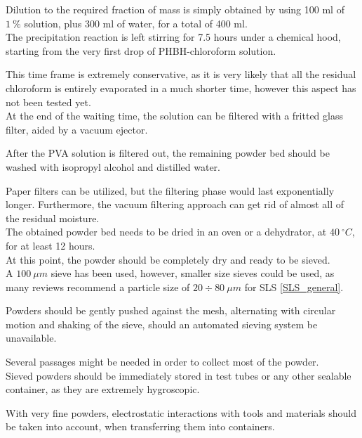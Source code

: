 \documentclass{article}
\begin{document}
        Dilution to the required fraction of mass is simply obtained by using 100 ml of $1 \ \%$ solution, 
        plus 300 ml of water, for a total of 400 ml. \\ 

        The precipitation reaction is left stirring for 7.5 hours under a 
        chemical hood, starting from the very first drop of PHBH-chloroform solution. 

        This time frame is extremely conservative, as it is very likely that all the residual chloroform is entirely 
        evaporated in a much shorter time, however this aspect has not been tested yet. \\

        At the end of the waiting time, the solution can be filtered with a fritted glass filter, aided by a vacuum 
        ejector. 

        After the PVA solution is filtered out, the remaining powder bed should be washed with isopropyl alcohol and 
        distilled water. 

        Paper filters can be utilized, but the filtering phase would last exponentially longer. Furthermore, the vacuum filtering 
        approach can get rid of almost all of the residual moisture. \\ 

        The obtained powder bed needs to be dried in an oven or a dehydrator, at $40 \ ^{\circ}C$, for at least 12 hours. \\ 

        At this point, the powder should be completely dry and ready to be sieved. \\ 

        A $100 \ \mu m$ sieve has been used, however, smaller size sieves could be used, as many reviews recommend a particle 
        size of $20 \div 80 \ \mu m$ for SLS \ref{SLS_general}. 
        
        Powders should be gently pushed against the mesh, alternating with circular motion and shaking of the sieve, should 
        an automated sieving system be unavailable. 

        Several passages might be needed in order to collect most of the powder. \\ 

        Sieved powders should be immediately stored in test tubes or any other sealable container, as they are extremely hygroscopic. 

        With very fine powders, electrostatic interactions with tools and materials should be taken into account, when transferring 
        them into containers. 
\end{document}
